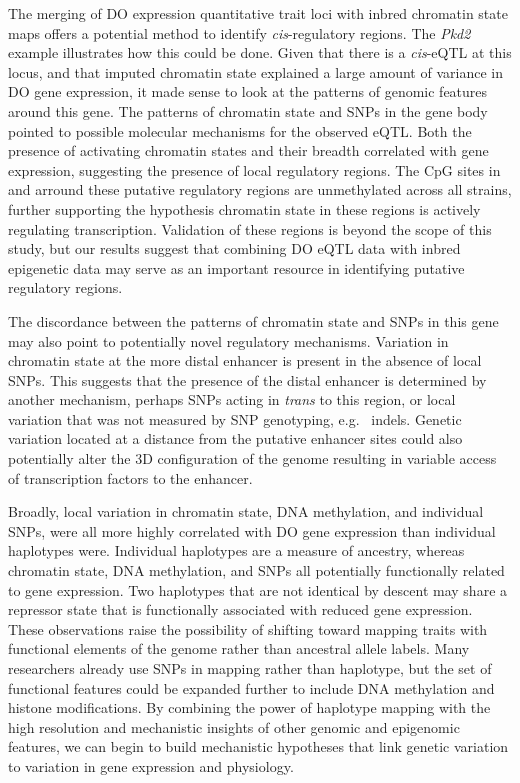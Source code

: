 \documentclass[
  11pt,
]{article}
\begin{document}
The merging of DO expression quantitative trait loci with inbred
chromatin state maps offers a potential method to identify
\textit{cis}-regulatory regions. The \textit{Pkd2} example illustrates
how this could be done. Given that there is a \textit{cis}-eQTL at this
locus, and that imputed chromatin state explained a large amount of
variance in DO gene expression, it made sense to look at the patterns of
genomic features around this gene. The patterns of chromatin state and
SNPs in the gene body pointed to possible molecular mechanisms for the
observed eQTL. Both the presence of activating chromatin states and
their breadth correlated with gene expression, suggesting the presence
of local regulatory regions. The CpG sites in and arround these putative
regulatory regions are unmethylated across all strains, further
supporting the hypothesis chromatin state in these regions is actively
regulating transcription. Validation of these regions is beyond the
scope of this study, but our results suggest that combining DO eQTL data
with inbred epigenetic data may serve as an important resource in
identifying putative regulatory regions.

The discordance between the patterns of chromatin state and SNPs in this
gene may also point to potentially novel regulatory mechanisms.
Variation in chromatin state at the more distal enhancer is present in
the absence of local SNPs. This suggests that the presence of the distal
enhancer is determined by another mechanism, perhaps SNPs acting in
\emph{trans} to this region, or local variation that was not measured by
SNP genotyping, e.g.~ indels. Genetic variation located at a distance
from the putative enhancer sites could also potentially alter the 3D
configuration of the genome resulting in variable access of
transcription factors to the enhancer.

Broadly, local variation in chromatin state, DNA methylation, and
individual SNPs, were all more highly correlated with DO gene expression
than individual haplotypes were. Individual haplotypes are a measure of
ancestry, whereas chromatin state, DNA methylation, and SNPs all
potentially functionally related to gene expression. Two haplotypes that
are not identical by descent may share a repressor state that is
functionally associated with reduced gene expression. These observations
raise the possibility of shifting toward mapping traits with functional
elements of the genome rather than ancestral allele labels. Many
researchers already use SNPs in mapping rather than haplotype, but the
set of functional features could be expanded further to include DNA
methylation and histone modifications. By combining the power of
haplotype mapping with the high resolution and mechanistic insights of
other genomic and epigenomic features, we can begin to build mechanistic
hypotheses that link genetic variation to variation in gene expression
and physiology.
\end{document}
